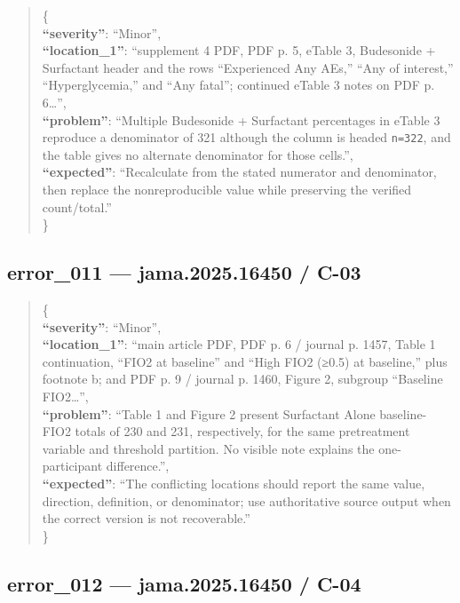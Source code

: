 \documentclass[
  letterpaper,
  9pt]{extreport}
\begin{document}
\begin{quote}
\{\\
\textbf{``severity''}: ``Minor'',\\
\textbf{``location\_1''}: ``supplement 4 PDF, PDF p. 5, eTable 3,
Budesonide + Surfactant header and the rows ``Experienced Any AEs,''
``Any of interest,'' ``Hyperglycemia,'' and ``Any fatal''; continued
eTable 3 notes on PDF p. 6\ldots{}'',\\
\textbf{``problem''}: ``Multiple Budesonide + Surfactant percentages in
eTable 3 reproduce a denominator of 321 although the column is headed
\texttt{n=322}, and the table gives no alternate denominator for those
cells.'',\\
\textbf{``expected''}: ``Recalculate from the stated numerator and
denominator, then replace the nonreproducible value while preserving the
verified count/total.''\\
\}
\end{quote}

\hypertarget{error_011--jama202516450--c-03}{%
\subsection{error\_011 --- jama.2025.16450 /
C-03}\label{error_011--jama202516450--c-03}}

\begin{quote}
\{\\
\textbf{``severity''}: ``Minor'',\\
\textbf{``location\_1''}: ``main article PDF, PDF p. 6 / journal p.
1457, Table 1 continuation, ``FIO2 at baseline'' and ``High FIO2 (≥0.5)
at baseline,'' plus footnote b; and PDF p. 9 / journal p. 1460, Figure
2, subgroup ``Baseline FIO2\ldots{}'',\\
\textbf{``problem''}: ``Table 1 and Figure 2 present Surfactant Alone
baseline-FIO2 totals of 230 and 231, respectively, for the same
pretreatment variable and threshold partition. No visible note explains
the one-participant difference.'',\\
\textbf{``expected''}: ``The conflicting locations should report the
same value, direction, definition, or denominator; use authoritative
source output when the correct version is not recoverable.''\\
\}
\end{quote}

\hypertarget{error_012--jama202516450--c-04}{%
\subsection{error\_012 --- jama.2025.16450 /
C-04}\label{error_012--jama202516450--c-04}}
\end{document}
